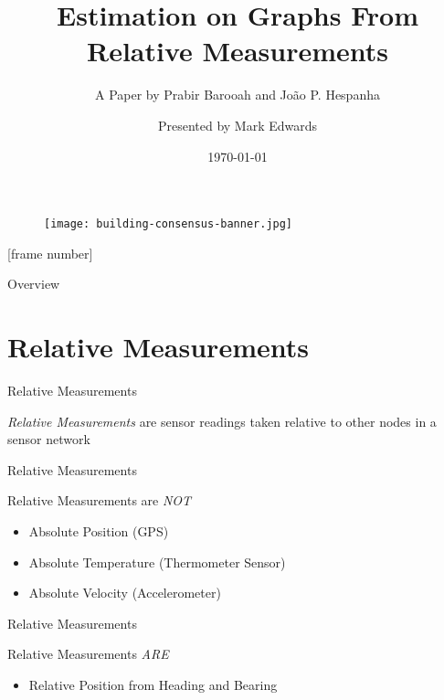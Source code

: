 \documentclass{beamer}
\title{Estimation on Graphs From Relative Measurements}
\subtitle{A Paper by Prabir Barooah and Jo\~{a}o P. Hespanha}
\author{Presented by Mark Edwards}%
\institute{\url{mark.edards727@myci.csuci.edu}\\
    University of California Channel Islands}
\date{\today}
\begin{document}
\begin{frame}
\titlepage
\end{frame}

\begin{frame}
\begin{figure}[c]
\texttt{[image: building-consensus-banner.jpg]}
\end{figure}
\end{frame}

[frame number]

\begin{frame}{Overview}
\tableofcontents %
\nocite{barooah}
\end{frame}

\section{Relative Measurements}
\begin{frame}{Relative Measurements}
\begin{center}
\emph{Relative Measurements} are sensor readings taken relative to other nodes
in a sensor network
\end{center}
\end{frame}

\begin{frame}{Relative Measurements}
\begin{center}
Relative Measurements are \emph{NOT}
\begin{itemize}
\item<1-> Absolute Position (GPS)
\item<2-> Absolute Temperature (Thermometer Sensor)
\item<3-> Absolute Velocity (Accelerometer)
\end{itemize}
\end{center}
\end{frame}

\begin{frame}{Relative Measurements}
\begin{center}
Relative Measurements \emph{ARE}
\begin{itemize}
\item Relative Position from Heading and Bearing
\end{itemize}
\end{center}
\end{frame}
\end{document}
